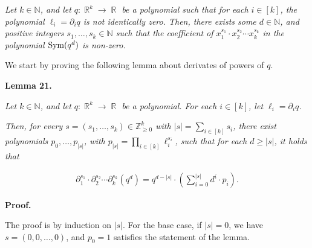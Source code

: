 \documentclass[10pt,a4paper]{article}
\begin{document}
\emph{Let $k\in\mathbb{N}$, and let $q:\mathop{\mathbb{R}}^{k}\to\mathop{\mathbb{R}}$ be a polynomial such that for each $i\in[k]$, the polynomial $\ell_{i}=\partial_{i}q$ is not identically zero.
Then, there exists some $d\in\mathbb{N}$, and positive integers $s_{1},\dots,s_{k}\in\mathbb{N}$ such that the coefficient of $x_{1}^{s_{1}}\cdot x_{2}^{s_{2}}\cdots x_{k}^{s_{k}}$ in the polynomial $\textnormal{Sym}(q^{d})$ is non-zero.}\par






We start by proving the following lemma about derivates of powers of $q$.\par





\par\medskip\noindent\textbf{
\textbf{Lemma 21}\textbf{.}
}\par



\emph{Let $k\in\mathbb{N}$, and let $q:\mathop{\mathbb{R}}^{k}\to\mathop{\mathbb{R}}$ be a polynomial. For each $i\in[k]$, let $\ell_{i}=\partial_{i}q$.}\par




\emph{Then, for every $s=(s_{1},\dots,s_{k})\in\mathbb{Z}_{\geqslant 0}^{k}$ with $\left|s\right|=\sum_{i\in[k]}s_{i}$, there exist polynomials $p_{0},\dots,p_{\left|s\right|}$, with $p_{\left|s\right|}=\prod_{i\in[k]}\ell_{i}^{s_{i}}$, such that for each $d\geqslant\left|s\right|$, it holds that}\par


\[\begin{gathered}
\partial_{1}^{s_{1}}\cdot\partial_{2}^{s_{2}}\cdots\partial_{k}^{s_{k}}\left(q^{d}\right)=q^{d-\left|s\right|}\cdot\left(\sum_{i=0}^{\left|s\right|}d^{i}\cdot p_{i}\right).
\end{gathered}\]






\par\medskip\noindent\textbf{Proof.}\par




The proof is by induction on $\left|s\right|$.
For the base case, if $\left|s\right|=0$, we have $s=(0,0,\dots,0)$, and $p_{0}=1$ satisfies the statement of the lemma.\par
\end{document}
